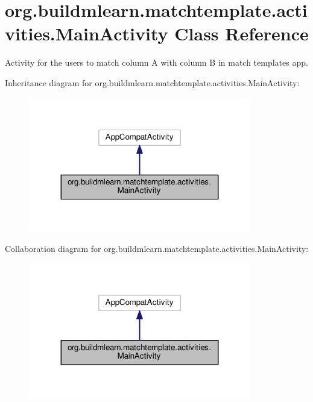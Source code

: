 \hypertarget{classorg_1_1buildmlearn_1_1matchtemplate_1_1activities_1_1MainActivity}{}\section{org.\+buildmlearn.\+matchtemplate.\+activities.\+Main\+Activity Class Reference}
\label{classorg_1_1buildmlearn_1_1matchtemplate_1_1activities_1_1MainActivity}


Activity for the users to match column A with column B in match template\textquotesingle{}s app.  




Inheritance diagram for org.\+buildmlearn.\+matchtemplate.\+activities.\+Main\+Activity\+:
\nopagebreak
\begin{figure}[H]
\begin{center}
\leavevmode
\includegraphics[width=275pt]{classorg_1_1buildmlearn_1_1matchtemplate_1_1activities_1_1MainActivity__inherit__graph}
\end{center}
\end{figure}


Collaboration diagram for org.\+buildmlearn.\+matchtemplate.\+activities.\+Main\+Activity\+:
\nopagebreak
\begin{figure}[H]
\begin{center}
\leavevmode
\includegraphics[width=275pt]{classorg_1_1buildmlearn_1_1matchtemplate_1_1activities_1_1MainActivity__coll__graph}
\end{center}
\end{figure}

